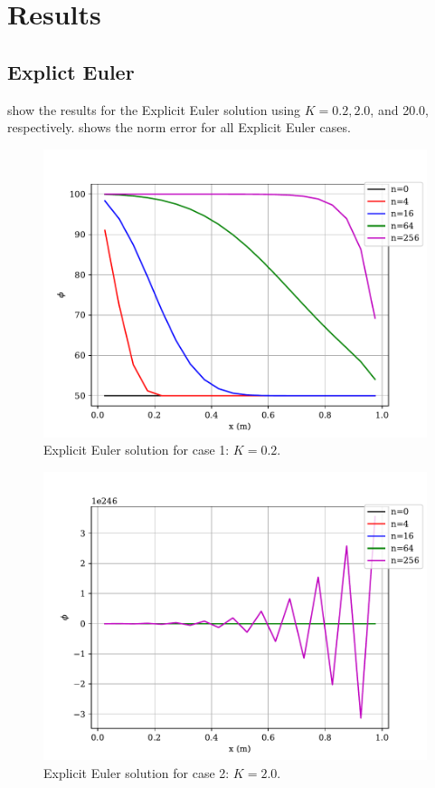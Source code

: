 \documentclass[12pt]{article}
\begin{document}
\clearpage
\section{Results}

\subsection{Explict Euler}
 show the results for the Explicit Euler solution using $K=0.2,2.0$, and 20.0, respectively.  shows the norm error for all Explicit Euler cases.
\begin{figure}[htbp]
    \centering
    \includegraphics[width=\textwidth]{plots/graph_EE_case1.pdf}
    \caption{Explicit Euler solution for case 1: $K=0.2$.}
    \label{fig:ee1}
\end{figure}

\begin{figure}[htbp]
    \centering
    \includegraphics[width=\textwidth]{plots/graph_EE_case2.pdf}
    \caption{Explicit Euler solution for case 2: $K=2.0$.}
    \label{fig:ee2}
\end{figure}
\end{document}
